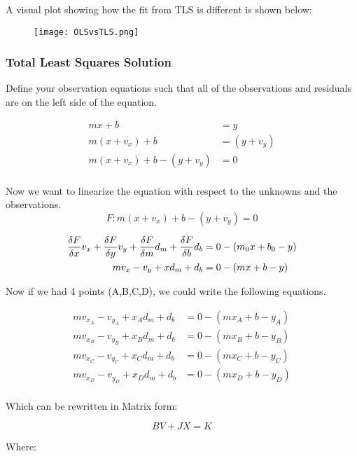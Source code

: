 A visual plot showing how the fit from TLS is different is shown below:
\begin{figure}[H]
	\centering
	\texttt{[image: OLSvsTLS.png]}
\end{figure}


\subsubsection*{Total Least Squares Solution}
Define your observation equations such that all of the observations and residuals are on the left side of the equation.

\begin{align*}
mx + b &= y \\
m(x+v_x) + b &= (y+v_y) \\
m(x+v_x) + b - (y+v_y) &= 0 \\
\end{align*}

Now we want to linearize the equation with respect to the unknowns and the observations.  
\[
F: m(x+v_x) + b - (y+v_y) = 0
\]

\begin{align*}
\frac{\delta F}{\delta x}v_x + \frac{\delta F}{\delta y}v_y + \frac{\delta F}{\delta m}d_m + \frac{\delta F}{\delta b}d_b &= 0 - (m_0x+b_0-y) \\
mv_x -v_y + xd_m + d_b &= 0 - (mx+b-y) \\
\end{align*}

Now if we had 4 points (A,B,C,D), we could write the following equations.

\begin{align*}
mv_{x_A} -v_{y_A} + x_Ad_m + d_b &= 0 - (mx_A+b-y_A) \\
mv_{x_B} -v_{y_B} + x_Bd_m + d_b &= 0 - (mx_B+b-y_B) \\
mv_{x_C} -v_{y_C} + x_Cd_m + d_b &= 0 - (mx_C+b-y_C) \\
mv_{x_D} -v_{y_D} + x_Dd_m + d_b &= 0 - (mx_D+b-y_D) \\
\end{align*}

Which can be rewritten in Matrix form:

\[
BV + JX = K
\]

Where:


